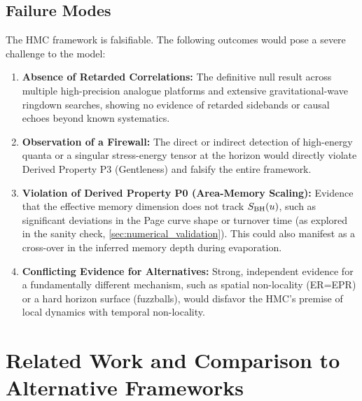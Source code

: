 \documentclass[a4paper,11pt]{article}
\newcommand{\HMC}{\textsc{HMC}\xspace}
\theoremstyle{plain}
\theoremstyle{definition}
\theoremstyle{remark}
\begin{document}
\subsection{Failure Modes}
The \HMC{} framework is falsifiable. The following outcomes would pose a severe challenge to the model:
\begin{enumerate}
    \item \textbf{Absence of Retarded Correlations:} The definitive null result across multiple high-precision analogue platforms and extensive gravitational-wave ringdown searches, showing no evidence of retarded sidebands or causal echoes beyond known systematics.
    \item \textbf{Observation of a Firewall:} The direct or indirect detection of high-energy quanta or a singular stress-energy tensor at the horizon would directly violate Derived Property P3 (Gentleness) and falsify the entire framework.
    \item \textbf{Violation of Derived Property P0 (Area-Memory Scaling):} Evidence that the effective memory dimension does not track $S_{\rm BH}(u)$, such as significant deviations in the Page curve shape or turnover time (as explored in the sanity check, \cref{sec:numerical_validation}). This could also manifest as a cross-over in the inferred memory depth during evaporation.
    \item \textbf{Conflicting Evidence for Alternatives:} Strong, independent evidence for a fundamentally different mechanism, such as spatial non-locality (ER=EPR) or a hard horizon surface (fuzzballs), would disfavor the \HMC{}'s premise of local dynamics with temporal non-locality.
\end{enumerate}

\section{Related Work and Comparison to Alternative Frameworks}
\label{sec:related-work}
\end{document}
